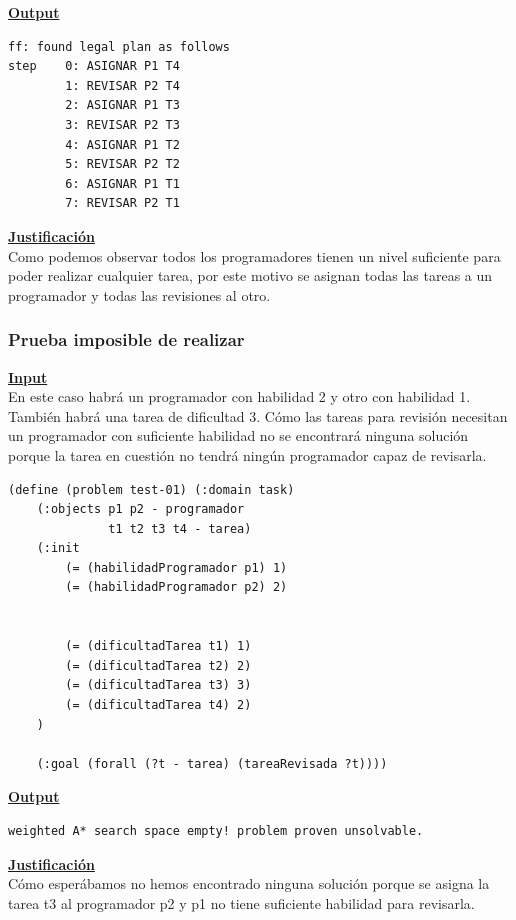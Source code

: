 \documentclass[11pt]{article}
\begin{document}
 \noindent \underline{\textbf{Output}}
\medskip
\begin{verbatim}
ff: found legal plan as follows
step    0: ASIGNAR P1 T4
        1: REVISAR P2 T4
        2: ASIGNAR P1 T3
        3: REVISAR P2 T3
        4: ASIGNAR P1 T2
        5: REVISAR P2 T2
        6: ASIGNAR P1 T1
        7: REVISAR P2 T1
\end{verbatim}
\medskip

\noindent \underline{\textbf{Justificación}}\\

Como podemos observar todos los programadores tienen un nivel suficiente para poder realizar cualquier tarea, por este motivo se asignan todas las tareas a un programador y todas las revisiones al otro.

\subsubsection{Prueba imposible de realizar}
\noindent \underline{\textbf{Input}} \\

En este caso habrá un programador con habilidad 2 y otro con habilidad 1. También habrá una tarea de dificultad 3. Cómo las tareas para revisión necesitan un programador con suficiente habilidad no se encontrará ninguna solución porque la tarea en cuestión no tendrá ningún programador capaz de revisarla.
\medskip
\begin{verbatim}
(define (problem test-01) (:domain task)
    (:objects p1 p2 - programador
			  t1 t2 t3 t4 - tarea)
    (:init
        (= (habilidadProgramador p1) 1)
        (= (habilidadProgramador p2) 2)
        
        
        (= (dificultadTarea t1) 1)
        (= (dificultadTarea t2) 2)
        (= (dificultadTarea t3) 3)
        (= (dificultadTarea t4) 2)
    )

    (:goal (forall (?t - tarea) (tareaRevisada ?t))))
\end{verbatim}

\noindent \underline{\textbf{Output}}
\medskip
\begin{verbatim}
weighted A* search space empty! problem proven unsolvable.
\end{verbatim}
\noindent \underline{\textbf{Justificación}} \\

Cómo esperábamos no hemos encontrado ninguna solución porque se asigna la tarea t3 al programador p2 y p1 no tiene suficiente habilidad para revisarla.
\medskip
\end{document}
